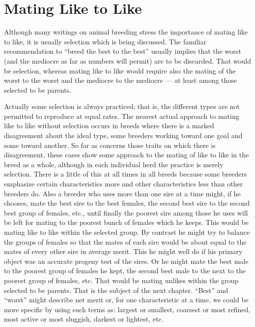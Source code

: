 \chapter{Mating Like to Like}
\label{cha:Lush_Chapter_27}

Although many writings on animal breeding stress the importance
of mating like to like, it is usually selection which is being discussed.
The familiar recommendation to ``breed the best to the best'' usually
implies that the worst (and the mediocre as far as numbers will permit)
are to be discarded. That would be selection, whereas mating like to
like would require also the mating of the worst to the worst and the
mediocre to the mediocre --- at least among those selected to be parents.

Actually some selection is always practiced; that is, the different
types are not permitted to reproduce at equal rates. The nearest actual
approach to mating like to like without selection occurs in breeds
where there is a marked disagreement about the ideal type, some breeders
working toward one goal and some toward another. So far as
concerns those traits on which there is disagreement, these cases show
some approach to the mating of like to like in the breed as a whole,
although in each individual herd the practice is merely selection. There
is a little of this at all times in all breeds because some breeders emphasize
certain characteristics more and other characteristics less than other
breeders do. Also a breeder who uses more than one sire at a time might,
if he chooses, mate the best sire to the best females, the second best sire
to the second best group of females, etc., until finally the poorest sire
among those he uses will be left for mating to the poorest bunch of
females which he keeps. This would be mating like to like within the
selected group. By contrast he might try to balance the groups of
females so that the mates of each sire would be about equal to the mates
of every other sire in average merit. This he might well do if his primary
object was an accurate progeny test of the sires. Or he might mate
the best male to the poorest group of females he kept, the second best
male to the next to the poorest group of females, etc. That would be
mating unlikes within the group selected to be parents. That is the subject
of the next chapter. ``Best'' and ``worst'' might describe net merit
or, for one characteristic at a time, we could be more specific by using
such terms as: largest or smallest, coarsest or most refined, most active
or most sluggish, darkest or lightest, etc.

